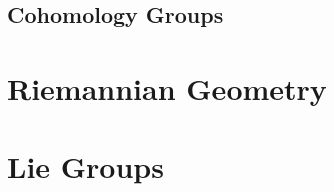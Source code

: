 \documentclass{article}
\theoremstyle{definition}
\begin{document}
\subsection{Cohomology Groups}

\newpage
\section{Riemannian Geometry}

\newpage
\section{Lie Groups}





\end{document}
